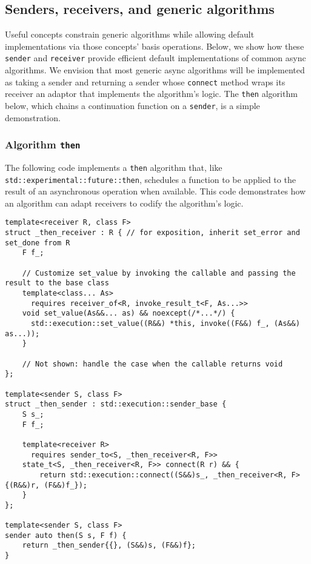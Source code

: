 \documentclass[a4paper,12pt,notitlepage,twoside,openright]{article}
\begin{document}
\hypertarget{senders-receivers-and-generic-algorithms}{%
\subsection{Senders, receivers, and generic
algorithms}\label{senders-receivers-and-generic-algorithms}}

Useful concepts constrain generic algorithms while allowing default
implementations via those concepts' basis operations. Below, we show how
these \texttt{sender} and \texttt{receiver}
provide efficient default implementations of common async algorithms. We
envision that most generic async algorithms will be implemented as
taking a sender and returning a sender whose
\texttt{connect} method wraps its receiver an adaptor that
implements the algorithm's logic. The \texttt{then}
algorithm below, which chains a continuation function on a
\texttt{sender}, is a simple demonstration.

\hypertarget{algorithm-then}{%
\subsubsection{\texorpdfstring{Algorithm
\texttt{then}}{Algorithm }}\label{algorithm-then}}

The following code implements a \texttt{then} algorithm
that, like \texttt{std::experimental::future::then},
schedules a function to be applied to the result of an asynchronous
operation when available. This code demonstrates how an algorithm can
adapt receivers to codify the algorithm's logic.

\begin{verbatim}
template<receiver R, class F>
struct _then_receiver : R { // for exposition, inherit set_error and set_done from R
    F f_;

    // Customize set_value by invoking the callable and passing the result to the base class
    template<class... As>
      requires receiver_of<R, invoke_result_t<F, As...>>
    void set_value(As&&... as) && noexcept(/*...*/) {
      std::execution::set_value((R&&) *this, invoke((F&&) f_, (As&&) as...));
    }

    // Not shown: handle the case when the callable returns void
};

template<sender S, class F>
struct _then_sender : std::execution::sender_base {
    S s_;
    F f_;

    template<receiver R>
      requires sender_to<S, _then_receiver<R, F>>
    state_t<S, _then_receiver<R, F>> connect(R r) && {
        return std::execution::connect((S&&)s_, _then_receiver<R, F>{(R&&)r, (F&&)f_});
    }
};

template<sender S, class F>
sender auto then(S s, F f) {
    return _then_sender{{}, (S&&)s, (F&&)f};
}
\end{verbatim}
\end{document}
